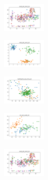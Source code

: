 \begin{figure}[H]
\begin{subfigure}
    \end{subfigure}
    \hfill
    \begin{subfigure}
        \centering
        \includegraphics[width=0.234\textwidth]{img/agesf/ecoli_set_const_20_589741062_clust.png}
    \end{subfigure}
    \hfill
    \begin{subfigure}
        \centering
        \includegraphics[width=0.234\textwidth]{img/agesf/rand_set_const_20_589741062_clust.png}
    \end{subfigure}
    \hfill
    \begin{subfigure}
        \centering
        \includegraphics[width=0.234\textwidth]{img/agesf/newthyroid_set_const_20_589741062_clust.png}
    \end{subfigure}
    \hfill
    \begin{subfigure}
        \centering
        \includegraphics[width=0.234\textwidth]{img/agesf/iris_set_const_20_277451237_clust.png}
    \end{subfigure}
    \hfill
    \begin{subfigure}
        \centering
        \includegraphics[width=0.234\textwidth]{img/agesf/ecoli_set_const_20_277451237_clust.png}
    \end{subfigure}
    \hfill

\end{figure}
